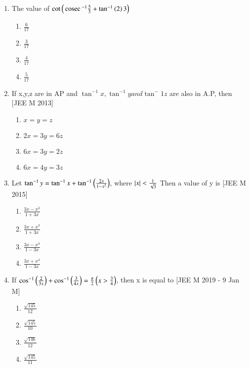 \documentclass[journal,12pt,twocolumn]{IEEEtran}
\theoremstyle{remark}
\begin{document}
\begin{enumerate}
{\begin{multicols}{2}
		\begin{enumerate}
			\item{$4$}
			\item{$5$}
			\columnbreak
			\item{$1$}
			\item{$3$}
		\end{enumerate}
		\end{multicols}
	}
	\item{
			The value of $\cot\left(\,\text{cosec}\,^{-1}\frac{5}{3} + \tan^{-1}\left(2\right){3}\right)$
		\begin{multicols}{2}
		\begin{enumerate}
			\item{$\frac{6}{17}$}
			\item{$\frac{3}{17} $}
			\columnbreak
			\item{$ \frac{4}{17}$}
			\item{$ \frac{5}{17}$}
		\end{enumerate}
		\end{multicols}
	}
	\item{
			If x,y,z are in AP and $\tan^{-1}x, \tan^{-1}y and \tan^-1{z}$ are also in A.P, then \hfill [JEE M 2013]
		\begin{multicols}{2}
		\begin{enumerate}
			\item{$x=y=z$}
			\item{$2x=3y=6z$}
			\columnbreak
			\item{$6x=3y=2z$}
			\item{$6x=4y=3z$}
		\end{enumerate}
		\end{multicols}
	}
	\item{
			Let $\tan^{-1}y = \tan^{-1}x + \tan^{-1}\left(\frac{2x}{1-x^2}\right)$, where $\left\vert x\right\vert < \frac{1}{\sqrt{3}}$ Then a value of y is \hfill [JEE M 2015]
		\begin{multicols}{2}
		\begin{enumerate}
			\item{$\frac{3x - x^3}{1 + 3x}$}
			\item{$\frac{3x + x^3}{1 + 3x} $}
			\columnbreak
			\item{$\frac{3x - x^3}{1 - 3x} $}
			\item{$\frac{3x + x^3}{1 - 3x} $}
		\end{enumerate}
		\end{multicols}
	}
	\item{
			If $\cos^{-1}\left(\frac{2}{3x}\right) + \cos^{-1}\left(\frac{3}{4x}\right) = \frac{\pi}{2} \left(x > \frac{3}{4}\right)$, then x is equal to \hfill [JEE M 2019 - 9 Jan M]
		\begin{multicols}{2}
		\begin{enumerate}
			\item{$\frac{\sqrt{145}}{12}$}
			\item{$\frac{\sqrt{145}}{10} $}
			\columnbreak
			\item{$\frac{\sqrt{146}}{12} $}
			\item{$\frac{\sqrt{145}}{11} $}
		\end{enumerate}
		\end{multicols}
	}
\end{enumerate}
\end{document}
